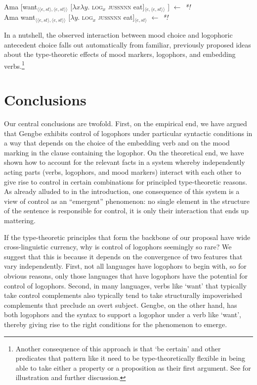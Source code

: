 \documentclass[output=paper,modfonts,nonflat]{langsci/langscibook}
\begin{document}
\ea \label{ex:grano:remote':34}
    \begin{xlist}
    \ex Ama [want$_{\langle\langle e,st\rangle,\langle e,st\rangle\rangle}$ [$\lambda x\lambda y$. \textsc{log}$_{x}$ \textsc{jussnnn} eat]$_{\langle e,\langle e,st\rangle\rangle}$ ] \hfill $\leftarrow$ \emph{*!}\\
    \ex Ama want$_{\langle\langle e,st\rangle,\langle e,st\rangle\rangle}$ [$\lambda y$. \textsc{log}$_{x}$ \textsc{jussnnn} eat]$_{\langle e,st\rangle}$  \hfill $\leftarrow$ \emph{*!}
    \end{xlist}
\z




In a nutshell, the observed interaction between mood choice and logophoric antecedent choice falls out automatically from familiar, previously proposed ideas about the type-theoretic effects of mood markers, logophors, and embedding verbs.\footnote{Another consequence of this approach is that `be certain' and other predicates that pattern like it  need to be type-theoretically flexible in being able to take either a property or a proposition as their first argument. See \citet{GranoToappear} for illustration and further discussion.}




\section{Conclusions}
\label{sec:Grano:Conclusions:5}

Our central conclusions are twofold. First, on the empirical end, we have argued that Gengbe exhibits  control of logophors under particular syntactic conditions in a way that depends on the choice of the embedding verb and on the mood marking in the clause containing the logophor. On the theoretical end, we have shown how to account for the relevant facts in a system whereby independently acting parts (verbs, logophors, and mood markers)  interact with each other to give rise to control in certain combinations for principled type-theoretic reasons. As already alluded to in the introduction, one consequence of this system is a view of control as an ``emergent'' phenomenon: no single element in the structure of the sentence is responsible for control, it is only their interaction that ends up mattering.

If the type-theoretic principles that form the backbone of our proposal have wide cross-linguistic currency, why is control of logophors seemingly so rare?  We suggest that this is because it depends on the convergence of two features that vary independently. First, not all languages have logophors to begin with, so for obvious reasons, only those languages that have logophors have the potential for control of logophors. Second, in many languages, verbs like `want' that typically take control complements also typically tend to take structurally impoverished complements that preclude an overt subject. Gengbe, on the other hand, has both logophors and the syntax to support a logophor under a verb like `want', thereby giving rise to the right conditions for the phenomenon to emerge.
\end{document}
